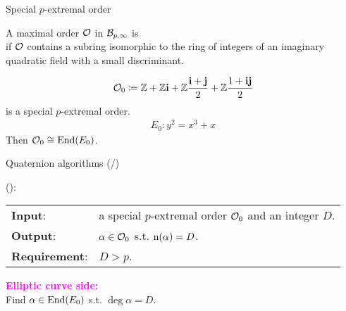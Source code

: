 \begin{frame}{Special $p$-extremal order}
    \begin{definition}[Informal]
        A maximal order $\mathcal{O}$ in $\mathcal{B}_{p,\infty}$ is \\
        if $\mathcal{O}$ contains a subring isomorphic to
        the ring of integers of an imaginary quadratic field with a small discriminant.
    \end{definition}

    \begin{align*}
        \mathcal{O}_0 \coloneqq \mathbb{Z} + \mathbb{Z}\mathbf{i} + \mathbb{Z}\frac{\mathbf{i} + \mathbf{j}}{2} + \mathbb{Z}\frac{1 + \mathbf{i}\mathbf{j}}{2}
    \end{align*}
    is a special $p$-extremal order.
    \begin{align*}
        E_0 : y^2 = x^3 + x
    \end{align*}
    Then $\mathcal{O}_0 \cong \mathrm{End}(E_0)$.
\end{frame}

\newcommand*{\algquatotal}{\total{cnt_alg_quat}}
\begin{frame}{Quaternion algorithms (/\algquatotal{})}

    {\large
    }
    (\cite{KLPT}):\\[5pt]
    \begin{tabular}{l l}
        \textbf{Input}: & a special $p$-extremal order $\mathcal{O}_0$ and an integer $D$.\\[3pt]
        \textbf{Output}: & $\alpha \in \mathcal{O}_0$ s.t. $\mathrm{n}(\alpha) = D$.\\[3pt]
        \textbf{Requirement}: & $D > p$.
    \end{tabular}

    \vspace{15pt}
    \textcolor{magenta}{\textbf{Elliptic curve side:}}\\[5pt]
    \quad Find $\alpha \in \mathrm{End}(E_0)$ s.t. $\deg\alpha = D$.

\end{frame}


